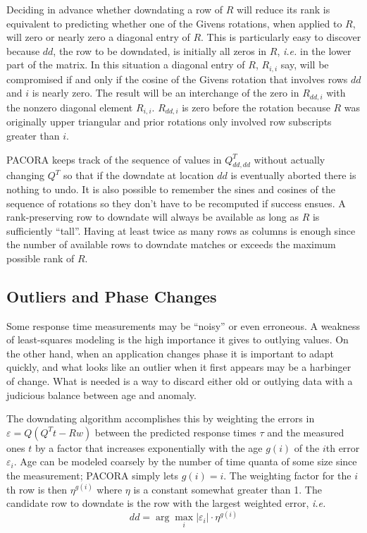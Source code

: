 Deciding in advance whether downdating a row of $R$ will reduce its rank
is equivalent to predicting whether one of the Givens rotations, when applied to $R$,
will zero or nearly zero a diagonal entry of $R$.
This is particularly easy to discover because $dd$, the row to be downdated, is initially all zeros in $R$,
\emph{i.e.} in the lower part of the matrix.
In this situation a diagonal entry of $R$, $R_{i,i}$ say, will be compromised if and only if the
cosine of the Givens rotation that involves rows $dd$ and $i$ is nearly zero.
The result will be an interchange of the zero in $R_{dd,i}$ with the nonzero diagonal element $R_{i,i}$.
$R_{dd,i}$ is zero before the rotation because
$R$ was originally upper triangular and prior rotations only involved row subscripts greater than $i$.

PACORA keeps track of the sequence of values in $Q^T_{dd,dd}$ without actually changing $Q^T$
so that if the downdate at location $dd$ is eventually aborted there is nothing to undo.
It is also possible to remember the sines and cosines of the sequence of rotations
so they don't have to be recomputed if success ensues.
A rank-preserving row to downdate will always be available as long as $R$ is sufficiently ``tall''.
Having at least twice as many rows as columns is enough since the number of available rows to downdate
matches or exceeds the maximum possible rank of $R$.

\subsection*{Outliers and Phase Changes}

Some response time measurements may be ``noisy'' or even erroneous.
A weakness of least-squares modeling is the high importance it gives to outlying values.
On the other hand, when an application changes phase it is important to adapt quickly,
and what looks like an outlier when it first appears may be a harbinger of change.
What is needed is a way to discard either old or outlying data
with a judicious balance between age and anomaly.

The downdating algorithm accomplishes this by weighting the errors in $\varepsilon = Q(Q^Tt - Rw)$
between the predicted response times $\tau$ and the measured ones $t$ by a factor
that increases exponentially with the age $g(i)$ of the $i$th error $\varepsilon_i$.
Age can be modeled coarsely by the number of time quanta of some size since the measurement;
PACORA simply lets $g(i) = i$.
The weighting factor for the $i$th row is then $\eta^{g(i)}$ where $\eta$ is a constant somewhat greater than 1.
The candidate row to downdate is the row with the largest weighted error, \emph{i.e.}
\begin{displaymath}
dd = \arg\max_i |\varepsilon_i| \cdot \eta^{g(i)}
\end{displaymath}

